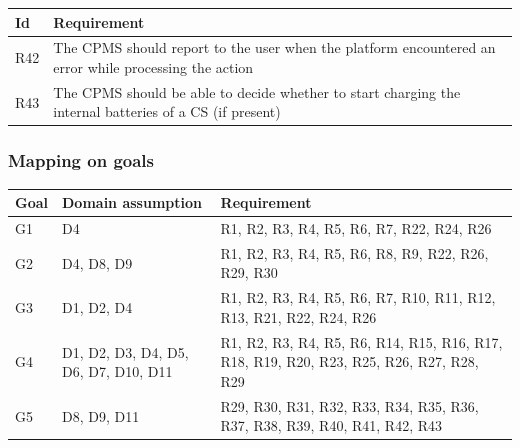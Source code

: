 \documentclass[11pt]{article}
\begin{document}
\begin{table}[H]
    \centering
    \setlength{\tabcolsep}{18pt}
    \renewcommand{\arraystretch}{1.2}
    \begin{tabularx}{\textwidth}{|>{\centering\hsize=0.1\hsize}X|>{\hsize=1.9\hsize}X|}
        \hline
        \textbf{Id} & \textbf{Requirement} \\
        \hline
        R42 & The CPMS should report to the user when the platform encountered an error while processing the action \\
        \hline
        R43 & The CPMS should be able to decide whether to start charging the internal batteries of a CS (if present) \\
        \hline
    \end{tabularx}
    \label{tab:requirements-2}
\end{table}

\subsubsection{Mapping on goals}

\begin{table}[H]
    \centering
    \setlength{\tabcolsep}{18pt}
    \renewcommand{\arraystretch}{1.2}
    \begin{tabularx}{\textwidth}{|>{\hsize=0.4\hsize}X|>{\hsize=1\hsize}X|>{\hsize=1.6\hsize}X|}
        \hline
        \textbf{Goal} & \textbf{Domain assumption} & \textbf{Requirement} \\
        \hline
        G1 & D4 & R1, R2, R3, R4, R5, R6, R7, R22, R24, R26 \\ %
        \hline
        G2 & D4, D8, D9 & R1, R2, R3, R4, R5, R6, R8, R9, R22, R26, R29, R30 \\ %
        \hline
        G3 & D1, D2, D4 & R1, R2, R3, R4, R5, R6, R7, R10, R11, R12, R13, R21, R22, R24, R26 \\ %
        \hline
        G4 & D1, D2, D3, D4, D5, D6, D7, D10, D11 & R1, R2, R3, R4, R5, R6, R14, R15, R16, R17, R18, R19, R20, R23, R25, R26, R27, R28, R29 \\ %
        \hline
        G5 & D8, D9, D11 & R29, R30, R31, R32, R33, R34, R35, R36, R37, R38, R39, R40, R41, R42, R43 \\ %
        \hline
    \end{tabularx}
    \label{tab:requirementsMapping}
\end{table}
\end{document}
